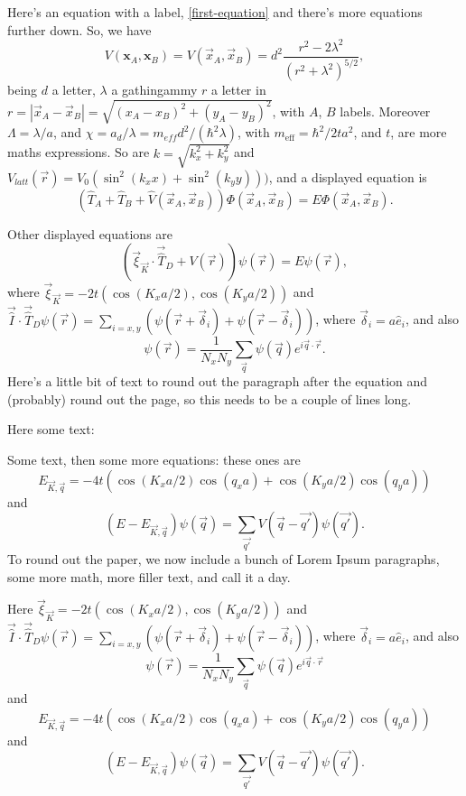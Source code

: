 \documentclass[twoside,british,a4paper]{article}
\begin{document}
Here's an equation with a label, \eqref{first-equation} and there's more equations further down. So, we have
\begin{equation}
V(\mathbf{x}_A,\mathbf{x}_B)=V(\vec{x}_A,\vec{x}_B)=d^2\frac{r^2-2\lambda^2}{(r^2+\lambda^2)^{5/2}},
\label{first-equation}
\end{equation}
being $d$ a letter, $\lambda$ a gathingammy $r$ a letter in $r=|\vec{x}_A-\vec{x}_B|=\sqrt{(x_A-x_B)^2+(y_A-y_B)^2}$, with  $A$, $B$  labels. Moreover $\Lambda=\lambda/a$, and  $\chi = a_{d}/\lambda = m_{eff}d^2/(\hbar^2 \lambda)$, with $m_\mathrm{eff}=\hbar^2/2ta^2$, and $t$, are more maths expressions. So are $k=\sqrt{k_x^2+k_y^2}$ and $V_{latt}(\vec r)= V_0\left(\sin^2(k_x x)+ \sin^2(k_y y)\right))$, and a displayed equation is 
\begin{equation}
\left(\hat{T}_A+\hat{T}_B+{\hat V}(\vec{x}_A,\vec{x}_B)\right)\Phi(\vec{x}_A,\vec{x}_B)=E\Phi(\vec{x}_A,\vec{x}_B).
\end{equation}

Other displayed equations are
\begin{equation}
(\vec{\xi}_{\vec{K}}\cdot\vec{\hat{T}}_D+V(\vec{r}))\psi(\vec{r})=E\psi(\vec{r}),
\end{equation}
where $\vec{\xi }_{\vec{K}}=-2t(\cos(K_x a/2),\cos(K_y a/2))$ and $\vec{\hat{I}}\cdot\vec{\hat{T}}_D\psi(\vec{r})=\sum_{i=x,y}\left(\psi(\vec{r}+\vec{\delta}_i)+\psi(\vec{r}-\vec{\delta}_i)\right)$, where $\vec{\delta}_i=a\hat{e}_{i}$, and also
\begin{equation}
\psi(\vec{r})=\frac{1}{N_x N_y}\sum_{\vec{q}}\psi(\vec{q})e^{i\vec{q}\cdot\vec{r}}.
\end{equation}
Here's a little bit of text to round out the paragraph after the equation and (probably) round out the page, so this needs to be a couple of lines long.

Here some text: \lipsum[7] 

Some text, then some more equations: these ones are
$$
E_{\vec{K},\vec{q}}=-4t\left(\cos(K_xa/2)\cos(q_xa)+\cos(K_ya/2)\cos(q_ya)\right)
$$ 
and 
\begin{equation}
(E-E_{\vec{K},\vec{q}})\psi(\vec{q})=\sum_{\vec{q'}}V(\vec{q}-\vec{q'})\psi(\vec{q'}). 
\end{equation}
To round out the paper, we now include a bunch of Lorem Ipsum paragraphs, some more math, more filler text, and call it a day.

\lipsum[1-3]

Here $\vec{\xi }_{\vec{K}}=-2t(\cos(K_x a/2),\cos(K_y a/2))$ and $\vec{\hat{I}}\cdot\vec{\hat{T}}_D\psi(\vec{r})=\sum_{i=x,y}\left(\psi(\vec{r}+\vec{\delta}_i)+\psi(\vec{r}-\vec{\delta}_i)\right)$, where $\vec{\delta}_i=a\hat{e}_{i}$, and also
\begin{equation}
\psi(\vec{r})=\frac{1}{N_x N_y}\sum_{\vec{q}}\psi(\vec{q})e^{i\vec{q}\cdot\vec{r}}
\end{equation}
and
$$
E_{\vec{K},\vec{q}}=-4t\left(\cos(K_xa/2)\cos(q_xa)+\cos(K_ya/2)\cos(q_ya)\right)
$$ 
and 
\begin{equation}
(E-E_{\vec{K},\vec{q}})\psi(\vec{q})=\sum_{\vec{q'}}V(\vec{q}-\vec{q'})\psi(\vec{q'}). 
\end{equation}
\end{document}
